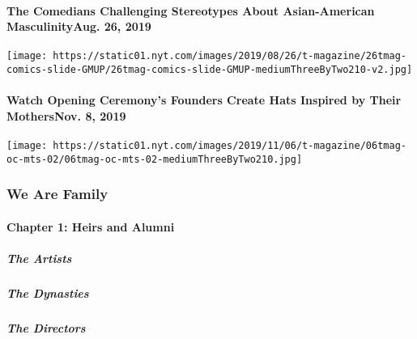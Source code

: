\hypertarget{the-comedians-challenging-stereotypes-about-asian-american-masculinityaug-26-2019}{%
\paragraph{The Comedians Challenging Stereotypes About Asian-American
MasculinityAug. 26,
2019}\label{the-comedians-challenging-stereotypes-about-asian-american-masculinityaug-26-2019}}

\texttt{[image: https://static01.nyt.com/images/2019/08/26/t-magazine/26tmag-comics-slide-GMUP/26tmag-comics-slide-GMUP-mediumThreeByTwo210-v2.jpg]}
\href{https://www.nytimes.com/2019/11/08/t-magazine/opening-ceremony-hats.html}{}

\hypertarget{watch-opening-ceremonys-founders-create-hats-inspired-by-their-mothersnov-8-2019}{%
\paragraph{Watch Opening Ceremony's Founders Create Hats Inspired by
Their MothersNov. 8,
2019}\label{watch-opening-ceremonys-founders-create-hats-inspired-by-their-mothersnov-8-2019}}

\texttt{[image: https://static01.nyt.com/images/2019/11/06/t-magazine/06tmag-oc-mts-02/06tmag-oc-mts-02-mediumThreeByTwo210.jpg]}

\hypertarget{we-are-family-1}{%
\subsubsection{We Are Family}\label{we-are-family-1}}

\hypertarget{chapter-1-heirs-and-alumni}{%
\paragraph{Chapter 1: Heirs and
Alumni}\label{chapter-1-heirs-and-alumni}}

\href{/interactive/2020/04/13/t-magazine/black-art-galleries.html}{}

\hypertarget{the-artists}{%
\subparagraph{The Artists}\label{the-artists}}

\href{/interactive/2020/04/13/t-magazine/italian-fashion-design-houses.html}{}

\hypertarget{the-dynasties}{%
\subparagraph{The Dynasties}\label{the-dynasties}}

\href{/interactive/2020/04/13/t-magazine/gordon-parks.html}{}

\hypertarget{the-directors}{%
\subparagraph{The Directors}\label{the-directors}}

